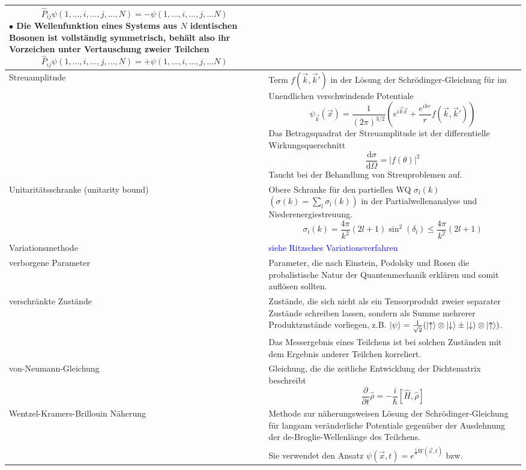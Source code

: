 \documentclass{article}
\newcommand{\diff}{\mathrm{d}}
\newcommand{\lr}[1]{\left(#1\right)}
\begin{document}
\begin{xltabular}{\linewidth}{p{6cm}|X}
				$$\hat{P}_{ij} \psi(1, ..., i, ..., j, ..., N) = -\psi(1,...,i,...,j,...N)$$
		$\bullet$ Die Wellenfunktion eines Systems aus $N$ identischen \textbf{Bosonen} ist \textbf{vollständig symmetrisch}, behält also ihr Vorzeichen unter Vertauschung zweier Teilchen
				$$\hat{P}_{ij} \psi(1, ..., i, ..., j, ..., N) = +\psi(1,...,i,...,j,...N)$$ \\
	\hline
		Streuamplitude & Term $f(\vec{k},\vec{k}')$ in der Lösung der Schrödinger-Gleichung für im Unendlichen verschwindende Potentiale
			$$\psi_{\vec{k}}(\vec{x}) = \frac{1}{(2\pi)^{3/2}} \lr{ e^{i\vec{k}\vec{x}} + \frac{e^{ikr}}{r} f(\vec{k},\vec{k}') }$$
		Das Betragsquadrat der Streuamplitude ist der differentielle Wirkungsquerschnitt
			$$\frac{\diff\sigma}{\diff\Omega} = |f(\theta)|^2$$
		\textcolor{gruen}{Taucht bei der Behandlung von Streuproblemen auf.}\\
	\hline
		Unitaritätsschranke (unitarity bound) & Obere Schranke für den partiellen WQ $\sigma_l(k)$ {\color{gruen}$\lr{ \sigma(k) = \sum_l \sigma_l(k) }$} in der Partialwellenanalyse und Niederenergiestreuung.
			$$\sigma_l(k) = \frac{4\pi}{k^2}(2l+1) \sin^2(\delta_l) \leq \frac{4\pi}{k^2}(2l+1)$$ \\
	\hline
		Variationsmethode & \textcolor{blue}{siehe Ritzsches Variationsverfahren} \\
	\hline
		verborgene Parameter & Parameter, die nach Einstein, Podolsky und Rosen die probalistische Natur der Quantenmechanik erklären und somit auflösen sollten. \\
	\hline
		verschränkte Zustände & Zustände, die sich nicht als ein Tensorprodukt zweier separater Zustände schreiben lassen, sondern als Summe mehrerer Produktzustände vorliegen, z.B.
			$\ket{\psi} = \frac{1}{\sqrt{2}}(\ket{\uparrow}\otimes\ket{\downarrow}\pm \ket{\downarrow}\otimes\ket{\uparrow})$. \\
			& Das Messergebnis eines Teilchens ist bei solchen Zuständen mit dem Ergebnis anderer Teilchen korreliert. \\
	\hline
		von-Neumann-Gleichung & Gleichung, die die zeitliche Entwicklung der Dichtematrix beschreibt
			$$\frac{\partial}{\partial t} \hat{\rho} = -\frac{i}{\hbar}[\hat{H},\hat{\rho}]$$ \\
	\hline
		Wentzel-Kramers-Brillouin Näherung & Methode zur näherungsweisen Lösung der Schrödinger-Gleichung für langsam veränderliche Potentiale gegenüber der Ausdehnung der de-Broglie-Wellenlänge des Teilchens. \\
		& Sie verwendet den Ansatz $\psi(\vec{x},t) = e^{\frac{i}{\hbar}W(\vec{x},t)}$ bzw.

\end{xltabular}
\end{document}
